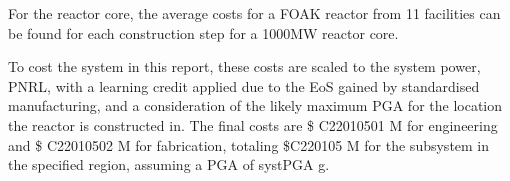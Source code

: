 For the reactor core, the average costs for a FOAK reactor from 11 facilities can be found for each construction step for a 1000MW reactor core.

To cost the system in this report, these costs are scaled to the system power, PNRL, with a learning credit applied due to the EoS gained by standardised manufacturing, and a consideration of the likely maximum PGA for the location the reactor is constructed in. The final costs are \$ C22010501 M for engineering and \$ C22010502 M for fabrication, totaling \$C220105 M for the subsystem in the specified region, assuming a PGA of systPGA g.
